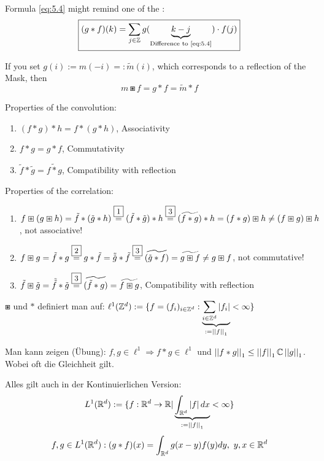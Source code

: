        Formula \eqref{eq:5.4} might remind one of the :
        \begin{equation}\label{eq:5.5}
            \framebox{$\displaystyle (g * f)(k) = \sum_{j \in \Z} g(\underbrace{k-j}_{\text{Difference to \eqref{eq:5.4}}}) \cdot f(j)$}
        \end{equation}

        If you set $g(i) := m(-i) =: \tilde m(i)$, which corresponds to a reflection of the Mask, then
        \[m \boxast f = g * f = \tilde m * f\]

        Properties of the convolution:
        \begin{enumerate}
            \item $(f * g) * h = f * (g* h)$, Associativity
            \item $f*g=g*f$, Commutativity
            \item $\tilde f * \tilde g = \widetilde{f * g}$, Compatibility with reflection
        \end{enumerate}
        
        Properties of the correlation:
        \begin{enumerate}
            \item $f \boxast (g \boxast h) = \tilde f * ( \tilde g* h) \overset{\framebox{\small 1}}{=} ( \tilde f * \tilde g) * h \overset{\framebox{\small 3}}{=} (\widetilde{f * g}) * h = (f * g) \boxast h \neq (f \boxast g) \boxast h$, not associative!
            \item $f \boxast g = \tilde f * g \overset{\framebox{\small 2}}{=} g * \tilde f = \tilde{\tilde g} * \tilde f \overset{\framebox{\small 3}}{=} \widetilde{(\tilde g * f)} = \widetilde{g \boxast f} \neq g \boxast f$, not commutative!
            \item $\tilde f \boxast \tilde g = \tilde{\tilde f} * \tilde g \overset{\framebox{\small 3}}{=} \widetilde{(\tilde f * g)} = \widetilde{f \boxast g}$, Compatibility with reflection
        \end{enumerate}

        $\boxast$ und $*$ definiert man auf: $\ell^1(\mathbb{Z}^d):=\{f=(f_i)_{i \in \mathbb{Z}^d} : \underbrace{\sum_{i \in \mathbb{Z}^d}\left\lvert f_i \right\rvert}_{:=\left\lvert \left\lvert f \right\rvert \right\rvert_1} < \infty\}$
        
            Man kann zeigen (Übung): $f,g \in \ell^1 \Rightarrow f * g \in \ell^1$ und $\left\lvert \left\lvert f * g \right\rvert \right\rvert_1 \leq \left\lvert \left\lvert f \right\rvert \right\rvert_1 \mathbb{C} \left\lvert \left\lvert g \right\rvert \right\rvert_1$.
            Wobei oft die Gleichheit gilt.
            
            Alles gilt auch in der Kontinuierlichen Version:
            \[L^1(\mathbb{R}^d) := \{f:\mathbb{R}^d \to \mathbb{R} | \underbrace{\int_{\mathbb{R}^d}\left\lvert f \right\rvert dx}_{:=\left\lvert \left\lvert f \right\rvert \right\rvert_1} < \infty\}\]
            \[f,g \in L^1(\mathbb{R}^d): (g*f)(x)=\int_{\mathbb{R}^d}g(x-y)f(y) dy, \ y,x \in \mathbb{R}^d\]
        
